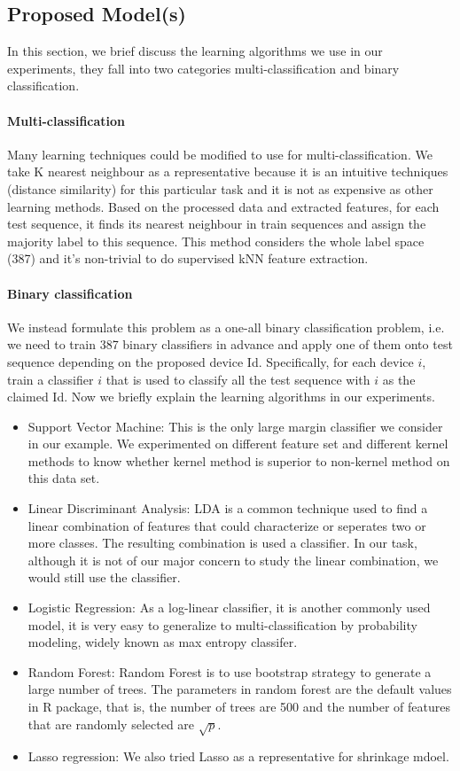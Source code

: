 \documentclass[11pt,letterpaper]{article}
\begin{document}
\subsection{Proposed Model(s)}
\label{sec:proposed-models}
In this section, we brief discuss the learning algorithms we use in our experiments, they fall into two categories multi-classification and binary classification.
\paragraph {Multi-classification}
Many learning techniques could be modified to use for multi-classification. We take K nearest neighbour as a representative because it is an intuitive techniques (distance similarity) for this particular task and it is not as expensive as other learning methods.
Based on the processed data and extracted features, for each test sequence, it finds its nearest neighbour in train sequences and assign the majority label to this sequence. This method considers the whole label space (387) and it's non-trivial to do supervised kNN feature extraction.
\paragraph {Binary classification}
We instead formulate this problem as a one-all binary classification problem, i.e. we need to train 387 binary classifiers in advance and apply one of them onto test sequence depending on the proposed device Id. Specifically, for each device $i$, train a classifier $i$ that is used to classify all the test sequence with $i$ as the claimed Id. Now we briefly explain the learning algorithms in our experiments.
\begin{itemize}
\item Support Vector Machine: This is the only large margin classifier we consider in our example. We experimented on different feature set and different kernel methods to know whether kernel method is superior to non-kernel method on this data set.
\item Linear Discriminant Analysis: LDA is a common technique used to find a linear combination of features that could characterize or seperates two or more classes. The resulting combination is used a classifier. In our task, although it is not of our major concern to study the linear combination, we would still use the classifier.
\item Logistic Regression: As a log-linear classifier, it is another commonly used model, it is very easy to generalize to multi-classification by probability modeling, widely known as max entropy classifer.
\item Random Forest: Random Forest is to use bootstrap strategy to generate a large number of trees. The parameters in random forest are the default values in R package, that is, the number of trees are 500 and the number of features that are randomly selected are $\sqrt{p}$.
\item Lasso regression: We also tried Lasso as a representative for shrinkage mdoel.
\end{itemize} 
\end{document}
